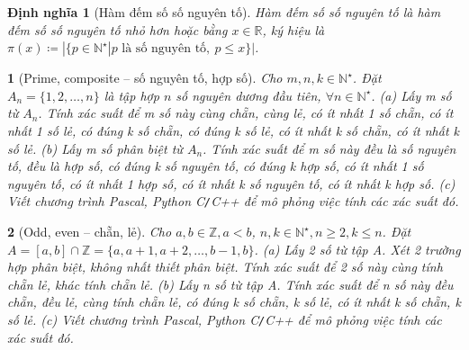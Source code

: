 \documentclass{article}
\newtheorem{baitoan}{}
\newtheorem{dinhnghia}{Định nghĩa}
\begin{document}
\begin{dinhnghia}[Hàm đếm số số nguyên tố]
	{\rm Hàm đếm số số nguyên tố} là hàm đếm số số nguyên tố nhỏ hơn hoặc bằng $x\in\mathbb{R}$, ký hiệu là $\pi(x)\coloneqq|\{p\in\mathbb{N}^\star|p \mbox{ là số nguyên tố},\ p\le x\}|$.
\end{dinhnghia}

\begin{baitoan}[Prime, composite -- số nguyên tố, hợp số]
	Cho $m,n,k\in\mathbb{N}^\star$. Đặt $A_n = \{1,2,\ldots,n\}$ là tập hợp $n$ số nguyên dương đầu tiên, $\forall n\in\mathbb{N}^\star$. (a) Lấy m số từ $A_n$. Tính xác suất để m số này cùng chẵn, cùng lẻ, có ít nhất 1 số chẵn, có ít nhất 1 số lẻ, có đúng k số chẵn, có đúng k số lẻ, có ít nhất k số chẵn, có ít nhất k số lẻ. (b) Lấy m số phân biệt từ $A_n$. Tính xác suất để m số này đều là số nguyên tố, đều là hợp số, có đúng k số nguyên tố, có đúng k hợp số, có ít nhất 1 số nguyên tố, có ít nhất 1 hợp số, có ít nhất k số nguyên tố, có ít nhất k hợp số. (c) Viết chương trình {\sf Pascal, Python C{\tt/}C++} để mô phỏng việc tính các xác suất đó.
\end{baitoan}

\begin{baitoan}[Odd, even -- chẵn, lẻ]
	Cho $a,b\in\mathbb{Z},a < b$, $n,k\in\mathbb{N}^\star,n\ge2,k\le n$. Đặt $A = [a,b]\cap\mathbb{Z} = \{a,a + 1,a + 2,\ldots,b - 1,b\}$. (a) Lấy 2 số từ tập A. Xét 2 trường hợp phân biệt, không nhất thiết phân biệt. Tính xác suất để 2 số này cùng tính chẵn lẻ, khác tính chẵn lẻ. (b) Lấy n số từ tập A. Tính xác suất để n số này đều chẵn, đều lẻ, cùng tính chẵn lẻ, có đúng k số chẵn, k số lẻ, có ít nhất k số chẵn, k số lẻ. (c) Viết chương trình {\sf Pascal, Python C{\tt/}C++} để mô phỏng việc tính các xác suất đó.
\end{baitoan}
\end{document}
